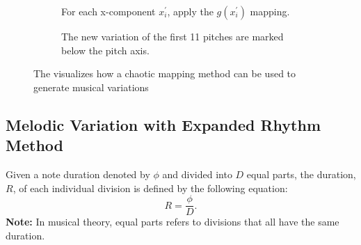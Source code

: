 \documentclass[11pt]{article}
\theoremstyle{definition}
\begin{document}
\begin{figure}
\begin{subfigure}{\textwidth}
  \caption{For each x-component $x^\prime_i$, apply the $g(x^\prime_{i})$ mapping.}
  \label{subfig:traj2nmp}

\end{subfigure}

\vspace{5pt}

\begin{subfigure}{\textwidth}
  \centering
  \caption{The new variation of the first 11 pitches  are marked below the pitch axis.}
  \label{subfig:nmp}

\end{subfigure}

\caption{The visualizes how a chaotic mapping method can be used to generate musical variations}
\label{fig:dabby method}
\end{figure}

\subsection{Melodic Variation with Expanded Rhythm Method} 
Given a note duration denoted by $\phi$ and divided into $D$ equal parts, the duration, $R$, of each individual division is defined by the following equation:
$$ R = \frac{\phi}{D}.  $$
\textbf{Note:} In musical theory, equal parts refers to divisions that all have the same duration.
\end{document}
